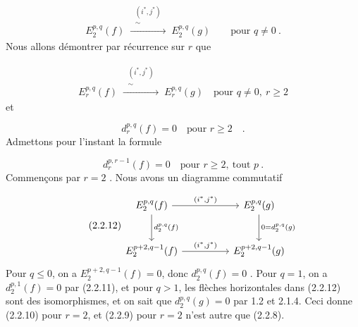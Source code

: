 \begin{multline}\tag{2.2.8}
E_2^{p,q}(f) \;\xrightarrow{\;\substack{(i^*,j^*)\\ \sim}\;}\; E_2^{p,q}(g) \qquad \text{pour } q \neq 0 \ .
\end{multline}
Nous allons démontrer par récurrence sur $r$ que

\begin{multline}\tag{2.2.9}
E_r^{p,q}(f) \;\xrightarrow{\;\substack{(i^*,j^*)\\ \sim}\;}\; E_r^{p,q}(g) \quad \text{pour } q \neq 0, \ r \geq 2
\end{multline}
et

\begin{equation}\tag{2.2.10}
d_r^{p,q}(f) = 0 \quad \text{pour } r \geq 2 \quad .
\end{equation}
Admettons pour l'instant la formule

\begin{equation}\tag{2.2.11}
d_r^{p,r-1}(f) = 0 \quad \text{pour } r \geq 2, \ \text{tout } p \ .
\end{equation}
Commençons par $r = 2$ . Nous avons un diagramme commutatif

\begin{equation}\tag{2.2.12}
\begin{tikzcd}[column sep=huge, row sep=large]
E_2^{p,q}(f) \arrow[r, "{(i^*,j^*)}"] \arrow[d, "{d_2^{p,q}(f)}"] & E_2^{p,q}(g) \arrow[d, "{0 = d_2^{p,q}(g)}"] \\
E_2^{p+2,q-1}(f) \arrow[r, "{(i^*,j^*)}"] & E_2^{p+2,q-1}(g)
\end{tikzcd}
\end{equation}
Pour $q \leq 0$, on a $E_2^{p+2,q-1}(f) = 0$, donc $d_2^{p,q}(f) = 0$ . Pour $q = 1$, on a $d_2^{p,1}(f) = 0$ par (2.2.11), et pour $q > 1$, les flèches horizontales dans (2.2.12) sont des isomorphismes, et on sait que $d_2^{p,q}(g) = 0$ par 1.2 et 2.1.4. Ceci donne (2.2.10) pour $r = 2$, et (2.2.9) pour $r = 2$ n'est autre que (2.2.8).


